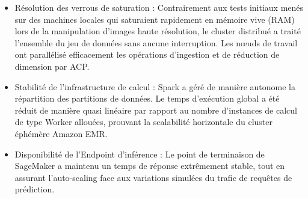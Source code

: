 \begin{itemize}
    \item[$\bullet$] Résolution des verrous de saturation : Contrairement aux tests initiaux menés sur des machines locales qui saturaient rapidement en mémoire vive (RAM) lors de la manipulation d'images haute résolution, le cluster distribué a traité l'ensemble du jeu de données sans aucune interruption. Les nœuds de travail ont parallélisé efficacement les opérations d'ingestion et de réduction de dimension par ACP.
    \item[$\bullet$] Stabilité de l'infrastructure de calcul : Spark a géré de manière autonome la répartition des partitions de données. Le temps d'exécution global a été réduit de manière quasi linéaire par rapport au nombre d'instances de calcul de type Worker allouées, prouvant la scalabilité horizontale du cluster éphémère Amazon EMR.
    \item[$\bullet$] Disponibilité de l'Endpoint d'inférence : Le point de terminaison de SageMaker a maintenu un temps de réponse extrêmement stable, tout en assurant l'auto-scaling face aux variations simulées du trafic de requêtes de prédiction.
\end{itemize}



